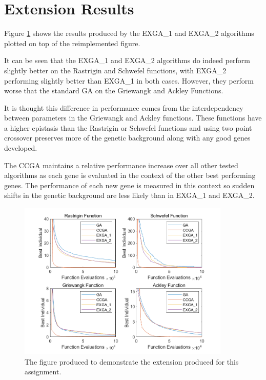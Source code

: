 \section{Extension Results} \label{sec:extension-results}

Figure \ref{fig:extension_plot} shows the results produced by the EXGA\_1 and EXGA\_2 algorithms plotted on top of the reimplemented figure. 

It can be seen that the EXGA\_1 and EXGA\_2 algorithms do indeed perform slightly better on the Rastrigin and Schwefel functions, with EXGA\_2 performing slightly better than EXGA\_1 in both cases.
However, they perform worse that the standard GA on the Griewangk and Ackley Functions.

It is thought this difference in performance comes from the interdependency between parameters in the Griewangk and Ackley functions. 
These functions have a higher epistasis than the Rastrigin or Schwefel functions and using two point crossover preserves more of the genetic background along with any good genes developed.

The CCGA maintains a relative performance increase over all other tested algorithms as each gene is evaluated in the context of the other best performing genes. 
The performance of each new gene is measured in this context so sudden shifts in the genetic background are less likely than in EXGA\_1 and EXGA\_2.

\begin{figure}[ht!]
    \centering 
    \includegraphics[width=0.9\textwidth]{img/extension_plot.png}
    \caption{The figure produced to demonstrate the extension produced for this assignment.}
    \label{fig:extension_plot}
  \end{figure}
